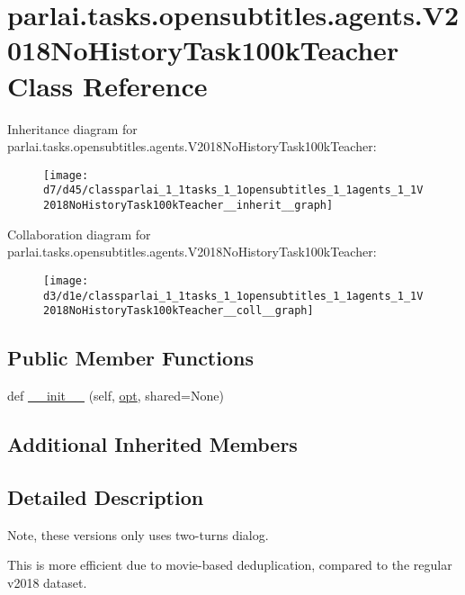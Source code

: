 \hypertarget{classparlai_1_1tasks_1_1opensubtitles_1_1agents_1_1V2018NoHistoryTask100kTeacher}{}\section{parlai.\+tasks.\+opensubtitles.\+agents.\+V2018\+No\+History\+Task100k\+Teacher Class Reference}
\label{classparlai_1_1tasks_1_1opensubtitles_1_1agents_1_1V2018NoHistoryTask100kTeacher}


Inheritance diagram for parlai.\+tasks.\+opensubtitles.\+agents.\+V2018\+No\+History\+Task100k\+Teacher\+:
\nopagebreak
\begin{figure}[H]
\begin{center}
\leavevmode
\texttt{[image: d7/d45/classparlai\_1\_1tasks\_1\_1opensubtitles\_1\_1agents\_1\_1V2018NoHistoryTask100kTeacher\_\_inherit\_\_graph]}
\end{center}
\end{figure}


Collaboration diagram for parlai.\+tasks.\+opensubtitles.\+agents.\+V2018\+No\+History\+Task100k\+Teacher\+:
\nopagebreak
\begin{figure}[H]
\begin{center}
\leavevmode
\texttt{[image: d3/d1e/classparlai\_1\_1tasks\_1\_1opensubtitles\_1\_1agents\_1\_1V2018NoHistoryTask100kTeacher\_\_coll\_\_graph]}
\end{center}
\end{figure}
\subsection*{Public Member Functions}
\begin{DoxyCompactItemize}
\item 
def \hyperlink{classparlai_1_1tasks_1_1opensubtitles_1_1agents_1_1V2018NoHistoryTask100kTeacher_ac0ca125ef0f17779db17f4ad044294e6}{\+\_\+\+\_\+init\+\_\+\+\_\+} (self, \hyperlink{classparlai_1_1core_1_1teachers_1_1FbDialogTeacher_af7a9ec497b9cd0292d7b8fa220da7c28}{opt}, shared=None)
\end{DoxyCompactItemize}
\subsection*{Additional Inherited Members}


\subsection{Detailed Description}
\begin{DoxyVerb}Note, these versions only uses two-turns dialog.

This is more efficient due to movie-based deduplication, compared to the regular
v2018 dataset.
\end{DoxyVerb}
 

